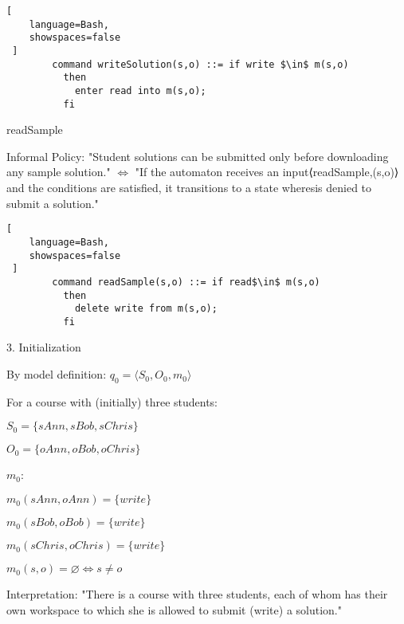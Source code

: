 \documentclass[a4paper]{article}
\begin{document}
\begin{multicols}{3}
    \begin{lstlisting}[
    language=Bash,
    showspaces=false
 ]
        command writeSolution(s,o) ::= if write $\in$ m(s,o) 
          then 
            enter read into m(s,o);
          fi
  \end{lstlisting}
    \begin{itemize*}
        \item readSample
        \item Informal Policy: "Student solutions can be submitted only before downloading any sample solution." $\Leftrightarrow$  "If the automaton receives an input⟨readSample,(s,o)⟩and the conditions are satisfied, it transitions to a state wheresis denied to submit a solution."
    \end{itemize*}
    \begin{lstlisting}[
    language=Bash,
    showspaces=false
 ]
        command readSample(s,o) ::= if read$\in$ m(s,o)
          then
            delete write from m(s,o);
          fi
  \end{lstlisting}
    3. Initialization
    \begin{itemize*}
        \item By model definition: $q_0 =⟨S_0 ,O_0 ,m_0 ⟩$
        \item For a course with (initially) three students:
              \begin{itemize*}
                  \item $S_0 =\{sAnn, sBob, sChris\}$
                  \item $O_0 =\{oAnn, oBob, oChris\}$
                  \item $m_0$:
                        \begin{itemize*}
                            \item $m_0(sAnn,oAnn)=\{write\}$
                            \item $m_0(sBob,oBob)=\{write\}$
                            \item $m_0(sChris,oChris)=\{write\}$
                            \item $m_0(s,o)=\varnothing \Leftrightarrow s\not= o$
                        \end{itemize*}
                  \item Interpretation: "There is a course with three students, each of whom has their own workspace to which she is allowed to submit (write) a solution."
              \end{itemize*}
    \end{itemize*}


\end{multicols}
\end{document}
